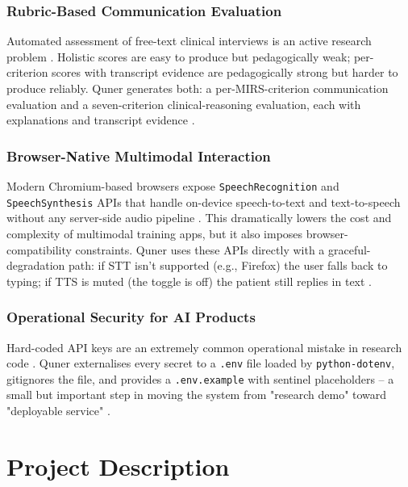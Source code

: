 \documentclass{article}
\begin{document}
\subsubsection{Rubric-Based Communication Evaluation}
Automated assessment of free-text clinical interviews is an active research problem \cite{Krugmann2024SentimentAI}. Holistic scores are easy to produce but pedagogically weak; per-criterion scores with transcript evidence are pedagogically strong but harder to produce reliably. Quner generates both: a per-MIRS-criterion communication evaluation and a seven-criterion clinical-reasoning evaluation, each with explanations and transcript evidence \cite{Mahajan2022TextualDQ}.

\subsubsection{Browser-Native Multimodal Interaction}
Modern Chromium-based browsers expose \texttt{SpeechRecognition} and \texttt{SpeechSynthesis} APIs that handle on-device speech-to-text and text-to-speech without any server-side audio pipeline \cite{Beloki2017ASA}. This dramatically lowers the cost and complexity of multimodal training apps, but it also imposes browser-compatibility constraints. Quner uses these APIs directly with a graceful-degradation path: if STT isn't supported (e.g., Firefox) the user falls back to typing; if TTS is muted (the toggle is off) the patient still replies in text \cite{Stokes2015ScalingNA}.

\subsubsection{Operational Security for AI Products}
Hard-coded API keys are an extremely common operational mistake in research code \cite{Shen2019ALA}. Quner externalises every secret to a \texttt{.env} file loaded by \texttt{python-dotenv}, gitignores the file, and provides a \texttt{.env.example} with sentinel placeholders -- a small but important step in moving the system from "research demo" toward "deployable service" \cite{Billhardt2002ACV}.

\newpage
\section{Project Description}
\end{document}
